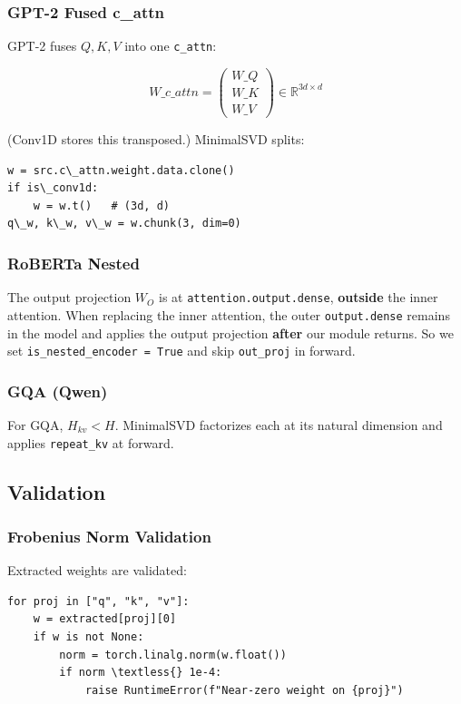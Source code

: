 \subsubsection{GPT-2 Fused c\_attn}

GPT-2 fuses $Q, K, V$ into one \texttt{c\_attn}:

\[
W\_{c\_attn} = \begin{pmatrix} W\_Q \\ W\_K \\ W\_V \end{pmatrix} \in \mathbb{R}^{3d \times d}
\tag{4.7}
\]

(Conv1D stores this transposed.) MinimalSVD splits:

\begin{lstlisting}
w = src.c\_attn.weight.data.clone()
if is\_conv1d:
    w = w.t()   # (3d, d)
q\_w, k\_w, v\_w = w.chunk(3, dim=0)
\end{lstlisting}

\subsubsection{RoBERTa Nested}

The output projection $W_O$ is at \texttt{attention.output.dense}, \textbf{outside} the 
inner attention. When replacing the inner attention, the outer \texttt{output.dense} 
remains in the model and applies the output projection \textbf{after} our module 
returns. So we set \texttt{is\_nested\_encoder = True} and skip \texttt{out\_proj} in forward.

\subsubsection{GQA (Qwen)}

For GQA, $H_{kv} < H$. MinimalSVD factorizes each at its natural dimension 
and applies \texttt{repeat\_kv} at forward.

\subsection{Validation}

\subsubsection{Frobenius Norm Validation}

Extracted weights are validated:

\begin{lstlisting}
for proj in ["q", "k", "v"]:
    w = extracted[proj][0]
    if w is not None:
        norm = torch.linalg.norm(w.float())
        if norm \textless{} 1e-4:
            raise RuntimeError(f"Near-zero weight on {proj}")
\end{lstlisting}

